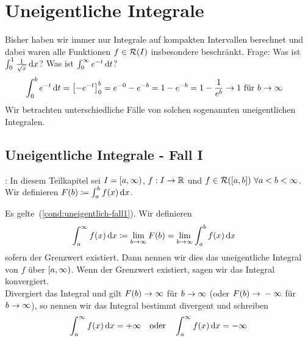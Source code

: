 \section{Uneigentliche Integrale}
\thispagestyle{pagenumberonly}

Bisher haben wir immer nur Integrale auf kompakten Intervallen berechnet und dabei waren alle Funktionen $f\in\mR\of{I}$ insbesondere beschränkt. Frage: Was ist $\int_{0}^{1} \frac{1}{\sqrt{x}} \mathop{}\!\mathrm{d} x$? Was ist $ \int_{0}^{\infty} e^{-t} \mathop{}\!\mathrm{d} t$?
\begin{align*}
    \int_{0}^{b} e^{-t} \mathop{}\!\mathrm{d} t &= \left[-e^{-t}\right]_0^b = e^{-0} - e^{-b} = 1 - e^{-b} = 1 -\frac{1}{e^b}\rightarrow{} 1 \text{ für } b\rightarrow{}\infty
\end{align*}
Wir betrachten unterschiedliche Fälle von solchen sogenannten uneigentlichen Integralen.

\subsection{Uneigentliche Integrale - Fall I}

\begin{mdframed}
    : In diesem Teilkapitel sei $I=\left[a, \infty\right)$, $f: I\to\mathbb{R}$ und $f\in\mR\of{\interv{a,b}}~\forall a < b < \infty$. Wir definieren $F\of{b} \coloneqq \int_{a}^{b} f\of{x} \dif x$.
\end{mdframed}

\begin{definition}
    Es gelte~(\ref{cond:uneigentlich-fall1}). Wir definieren
    \begin{align*}
        \int_{a}^{\infty} f\of{x} \dif x &\coloneqq \lim_{b\toinf} F\of{b} = \lim_{b\toinf} \int_{a}^{b} f\of{x} \dif x
    \end{align*}
    sofern der Grenzwert existiert. Dann nennen wir dies das uneigentliche Integral von $f$ über $\left[a,\infty\right)$. Wenn der Grenzwert existiert, sagen wir das Integral konvergiert.\\
    Divergiert das Integral und gilt $F\of{b}\toinf$ für $b\rightarrow{}\infty$ (oder $F\of{b}\fromto -\infty$ für $b\rightarrow{}\infty$), so nennen wir das Integral bestimmt divergent und schreiben
    \begin{align*}
        \int_{a}^{\infty} f\of{x} \dif x = +\infty\quad\text{oder}\quad\int_{a}^{\infty} f\of{x} \dif x = -\infty
    \end{align*}
\end{definition}

